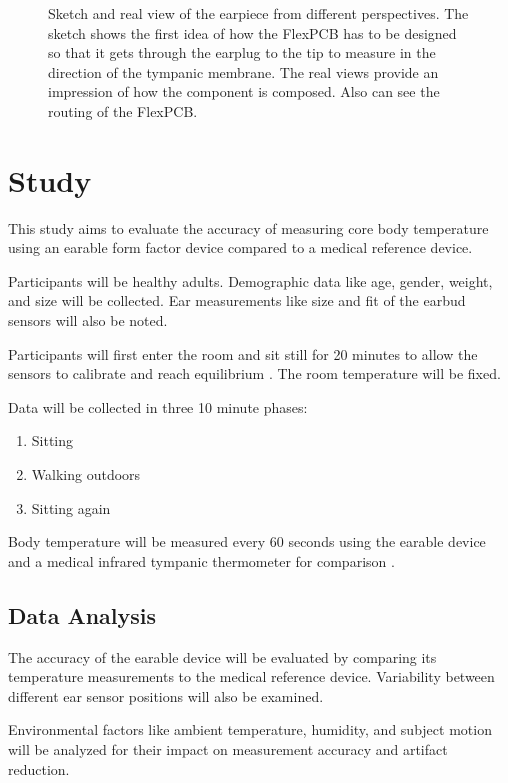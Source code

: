 \begin{figure}[!h]
    \caption{Sketch and real view of the earpiece from different perspectives.
The sketch shows the first idea of how the FlexPCB has to be designed so that it gets through the earplug to the tip to measure in the direction of the tympanic membrane. The real views provide an impression of how the component is composed. Also can see the routing of the FlexPCB.}
    \label{fig:design:prototype_earpiece_views}
\end{figure}

\section{Study}
\label{ch:Design:Study}
This study aims to evaluate the accuracy of measuring core body temperature using an earable form factor device compared to a medical reference device.

Participants will be healthy adults. Demographic data like age, gender, weight, and size will be collected. Ear measurements like size and fit of the earbud sensors will also be noted.

Participants will first enter the room and sit still for 20 minutes to allow the sensors to calibrate and reach equilibrium \cite{chagllae.MeasurementCoreBody2018}. The room temperature will be fixed.

Data will be collected in three 10 minute phases:
\begin{enumerate}
\item Sitting
\item Walking outdoors
\item Sitting again
\end{enumerate}

Body temperature will be measured every 60 seconds using the earable device and a medical infrared tympanic thermometer for comparison \cite{chagllae.MeasurementCoreBody2018,boanoNoninvasiveMeasurementCore2013}.

\subsection{Data Analysis}
The accuracy of the earable device will be evaluated by comparing its temperature measurements to the medical reference device. Variability between different ear sensor positions will also be examined.

Environmental factors like ambient temperature, humidity, and subject motion will be analyzed for their impact on measurement accuracy and artifact reduction.